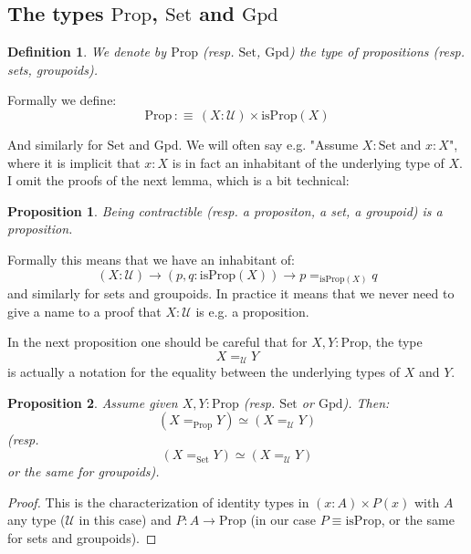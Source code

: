 \documentclass{article}
\newcommand{\sse}[1]{\medbreak \subsection{#1}}
\newcommand{\U}{{\mathcal U}}
\renewcommand{\r}{\rightarrow}
\newcommand{\Set}{\mathrm{Set}}
\newcommand{\Prop}{\mathrm{Prop}}
\newcommand{\Gpd}{\mathrm{Gpd}}
\newtheorem{definition}{Definition}
\newtheorem{proposition}{Proposition}
\begin{document}



\sse{The types $\Prop$, $\Set$ and $\Gpd$}

\begin{definition}
We denote by $\Prop$ (resp. $\Set$, $\Gpd$) the type of propositions (resp. sets, groupoids).%
\end{definition}

Formally we define:
\[\Prop \, :\equiv\, (X:\U)\times \mathrm{isProp}(X)\]

And similarly for $\Set$ and $\Gpd$. We will often say e.g. "Assume $X:\Set$ and $x:X$", where it is implicit that $x:X$ is in fact an inhabitant of the underlying type of $X$. I omit the proofs of the next lemma, which is a bit technical:

\begin{proposition}
Being contractible (resp. a propositon, a set, a groupoid) is a proposition.
\end{proposition}

Formally this means that we have an inhabitant of:
\[(X:\U)\r (p,q:\mathrm{isProp}(X)) \r p=_{\mathrm{isProp}(X)} q\] 
and similarly for sets and groupoids. In practice it means that we never need to give a name to a proof that $X:\U$ is e.g. a proposition.

In the next proposition one should be careful that for $X,Y:\Prop$, the type 
\[X=_\U Y\] 
is actually a notation for the equality between the underlying types of $X$ and $Y$.%

\begin{proposition}
Assume given $X,Y:\Prop$ (resp. $\Set$ or $\Gpd$). Then:
\[(X=_\Prop Y) \simeq (X=_\U Y)\]
(resp. 
\[(X=_\Set Y) \simeq (X=_\U Y)\]
or the same for groupoids).
\end{proposition}
\begin{proof}
This is the characterization of identity types in $(x:A)\times P(x)$ with $A$ any type ($\U$ in this case) and $P:A\r \Prop$ (in our case $P\equiv\mathrm{isProp}$, or the same for sets and groupoids). %
\end{proof}

\end{document}
